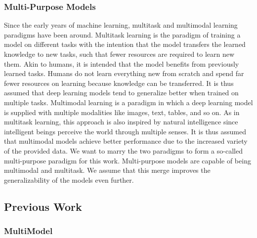 \documentclass[
]{krantz}
\begin{document}
\hypertarget{multi-purpose-models}{%
\subsubsection{Multi-Purpose Models}\label{multi-purpose-models}}

Since the early years of machine learning, multitask and multimodal learning paradigms have been around.
Multitask learning \citep{Crawshaw2020} is the paradigm of training a model on different tasks with the intention that the model transfers the learned knowledge to new tasks, such that fewer resources are required to learn new them. Akin to humans, it is intended that the model benefits from previously learned tasks. Humans do not learn everything new from scratch and spend far fewer resources on learning because knowledge can be transferred. It is thus assumed that deep learning models tend to generalize better when trained on multiple tasks.
Multimodal learning \citep{Baltrusaitis2019} is a paradigm in which a deep learning model is supplied with multiple modalities like images, text,
tables, and so on. As in multitask learning, this approach is also inspired by natural intelligence since intelligent beings perceive the world through multiple senses. It is thus assumed that multimodal models achieve better performance due to the increased variety of the provided data.
We want to marry the two paradigms to form a so-called multi-purpose paradigm for this work. Multi-purpose models are capable of being multimodal and multitask. We assume that this merge improves the generalizability of the models even further.

\hypertarget{previous-work}{%
\subsection{Previous Work}\label{previous-work}}

\hypertarget{multimodel}{%
\subsubsection{MultiModel}\label{multimodel}}
\end{document}
